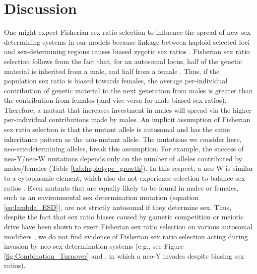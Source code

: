 \documentclass[12pt]{article}
\begin{document}
\section*{Discussion}

One might expect Fisherian sex ratio selection to influence the spread of new sex-determining systems in our models because linkage between haploid selected loci and sex-determining regions causes biased zygotic sex ratios \citep{Hamilton:1967ts,Burt:2006,Field:2012fd,Field:2013cc}. 
Fisherian sex ratio selection follows from the fact that, for an autosomal locus, half of the genetic material is inherited from a male, and half from a female \citep{Fisher:1930wy,West:2009we}. 
Thus, if the population sex ratio is biased towards females, the average per-individual contribution of genetic material to the next generation from males is greater than the contribution from females (and vice versa for male-biased sex ratios). 
Therefore, a mutant that increases investment in males will spread via the higher per-individual contributions made by males. 
An implicit assumption of Fisherian sex ratio selection is that the mutant allele is autosomal and has the same inheritance pattern as the non-mutant allele. 
The mutations we consider here, neo-sex-determining alleles, break this assumption. 
For example, the success of neo-Y/neo-W mutations depends only on the number of alleles contributed by males/females (Table \ref{tab:haplotype_growth}). 
In this respect, a neo-W is similar to a cytoplasmic element, which also do not experience selection to balance sex ratios \citep{Frank:1989vl,Werren:1998co,Chase:2007bf}.
Even mutants that are equally likely to be found in males or females, such as an environmental sex determination mutation (equation \ref{eq:lambda_ESD}), are not strictly autosomal if they determine sex. 
Thus, despite the fact that sex ratio biases caused by gametic competition or meiotic drive have been shown to exert Fisherian sex ratio selection on various autosomal modifiers \citep{Stalker:1961th,Smith:1975ft,Frank:1989vl,Hough:2013uo,Ubeda:2015fx, Otto:2015va}, we do not find evidence of Fisherian sex ratio selection acting during invasion by neo-sex-determination systems (e.g., see Figure \ref{fig:Combination_Turnover} and \citealt{Ubeda:2015fx}, in which a neo-Y invades despite biasing sex ratios). 
\end{document}
